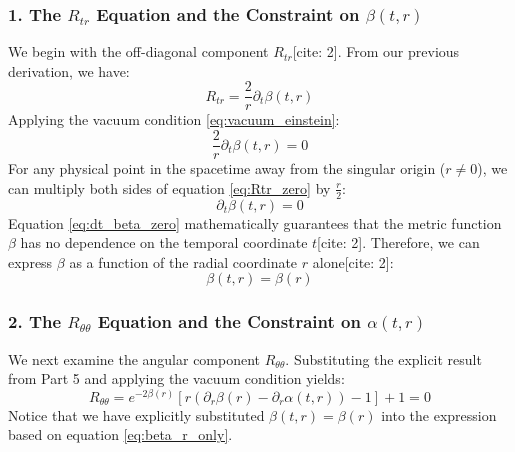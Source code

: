 \documentclass[11pt, a4paper]{report}
\begin{document}
\subsubsection*{1. The $R_{tr}$ Equation and the Constraint on $\beta(t,r)$}

We begin with the off-diagonal component $R_{tr}$[cite: 2]. From our previous derivation, we have:
\begin{equation}
    R_{tr} = \frac{2}{r} \partial_t \beta(t,r)
\end{equation}
Applying the vacuum condition \eqref{eq:vacuum_einstein}:
\begin{equation}
    \frac{2}{r} \partial_t \beta(t,r) = 0 \label{eq:Rtr_zero}
\end{equation}
For any physical point in the spacetime away from the singular origin ($r \neq 0$), we can multiply both sides of equation \eqref{eq:Rtr_zero} by $\frac{r}{2}$:
\begin{equation}
    \partial_t \beta(t,r) = 0 \label{eq:dt_beta_zero}
\end{equation}
Equation \eqref{eq:dt_beta_zero} mathematically guarantees that the metric function $\beta$ has no dependence on the temporal coordinate $t$[cite: 2]. Therefore, we can express $\beta$ as a function of the radial coordinate $r$ alone[cite: 2]:
\begin{equation}
    \beta(t,r) = \beta(r) \label{eq:beta_r_only}
\end{equation}

\subsubsection*{2. The $R_{\theta\theta}$ Equation and the Constraint on $\alpha(t,r)$}

We next examine the angular component $R_{\theta\theta}$. Substituting the explicit result from Part 5 and applying the vacuum condition yields:
\begin{equation}
    R_{\theta\theta} = e^{-2\beta(r)} \left[ r(\partial_r \beta(r) - \partial_r \alpha(t,r)) - 1 \right] + 1 = 0 \label{eq:R_thetatheta_zero}
\end{equation}
Notice that we have explicitly substituted $\beta(t,r) = \beta(r)$ into the expression based on equation \eqref{eq:beta_r_only}.
\end{document}
